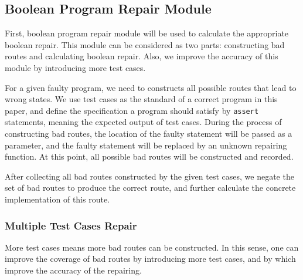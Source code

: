 \subsection{Boolean Program Repair Module}
First, boolean program repair module will be used to calculate the appropriate boolean repair. This module can be considered as two parts: constructing bad routes and calculating boolean repair.
Also, we improve the accuracy of this module by introducing more test cases.

For a given faulty program, we need to constructs all possible routes that lead to wrong states.
We use test cases as the standard of a correct program in this paper, and define the specification a program should satisfy by \lstinline|assert| statements, meaning the expected output of test cases.
During the process of constructing bad routes, the location of the faulty statement will be passed as a parameter, and the faulty statement will be replaced by an unknown repairing function.
At this point, all possible bad routes will be constructed and recorded.

After collecting all bad routes constructed by the given test cases, we negate the set of bad routes to produce the correct route, and further calculate the concrete implementation of this route.

\subsubsection{Multiple Test Cases Repair}
\label{section:MultipleTestCasesRepair}
More test cases means more bad routes can be constructed. In this sense, one can improve the coverage of bad routes by introducing more test cases, and by which improve the accuracy of the repairing.

